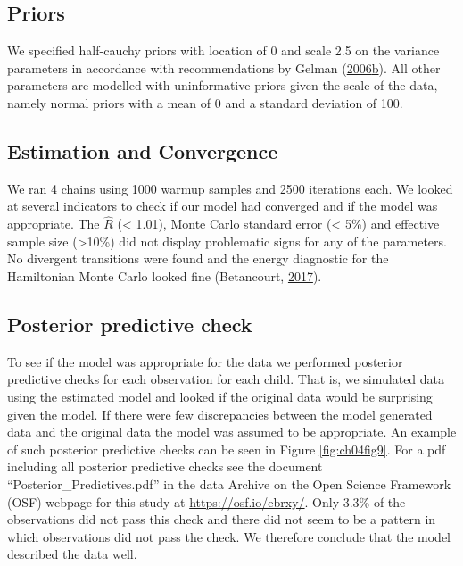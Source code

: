 \documentclass[openright,titlepage,12pt,a4paper]{book}
\begin{document}
\hypertarget{priors}{%
\subsection{Priors}\label{priors}}

We specified half-cauchy priors with location of 0 and scale 2.5 on the variance parameters in accordance with recommendations by Gelman (\protect\hyperlink{ref-gelman_prior_2006}{2006}\protect\hyperlink{ref-gelman_prior_2006}{b}). All other parameters are modelled with uninformative priors given the scale of the data, namely normal priors with a mean of 0 and a standard deviation of 100.

\hypertarget{estimation-and-convergence}{%
\subsection{Estimation and Convergence}\label{estimation-and-convergence}}

We ran 4 chains using 1000 warmup samples and 2500 iterations each. We looked at several indicators to check if our model had converged and if the model was appropriate. The \(\hat{R}\) (\textless{} 1.01), Monte Carlo standard error (\textless{} 5\%) and effective sample size (\textgreater10\%) did not display problematic signs for any of the parameters. No divergent transitions were found and the energy diagnostic for the Hamiltonian Monte Carlo looked fine (Betancourt, \protect\hyperlink{ref-betancourt_conceptual_2017}{2017}).

\hypertarget{posterior-predictive-check}{%
\subsection{Posterior predictive check}\label{posterior-predictive-check}}

To see if the model was appropriate for the data we performed posterior predictive checks for each observation for each child. That is, we simulated data using the estimated model and looked if the original data would be surprising given the model. If there were few discrepancies between the model generated data and the original data the model was assumed to be appropriate. An example of such posterior predictive checks can be seen in Figure \ref{fig:ch04fig9}. For a pdf including all posterior predictive checks see the document ``Posterior\_Predictives.pdf'' in the data Archive on the Open Science Framework (OSF) webpage for this study at \url{https://osf.io/ebrxy/}. Only 3.3\% of the observations did not pass this check and there did not seem to be a pattern in which observations did not pass the check. We therefore conclude that the model described the data well.
\end{document}

